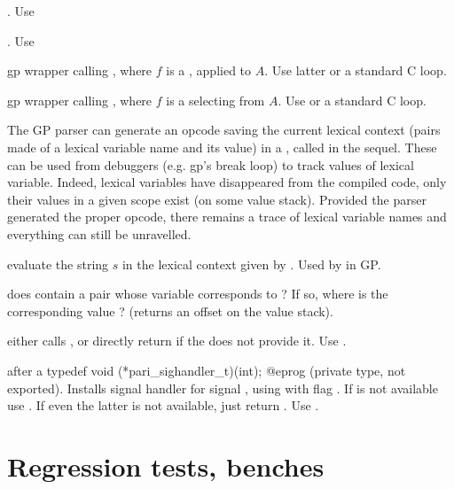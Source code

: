 . Use 

. Use 

 gp wrapper calling , where $f$
is a , applied to $A$. Use  latter or a standard C
loop.

 gp wrapper calling , where $f$
is a  selecting from $A$. Use  or a standard C loop.


The GP parser can generate an opcode saving the current lexical context
(pairs made of a lexical variable name and its value) in a , called
 in the sequel. These can be used from debuggers (e.g. gp's break
loop) to track values of lexical variable. Indeed, lexical variables have
disappeared from the compiled code, only their values in a given scope exist
(on some value stack). Provided the parser generated the proper opcode, there
remains a trace of lexical variable names and everything can still be
unravelled.

 evaluate the string $s$
in the lexical context given by .  Used by  in GP.

 does  contain
a pair whose variable corresponds to  ? If so, where is the
corresponding value ? (returns an offset on the value stack).


 either calls , or directly
return  if the  does not provide it. Use .

 after a
\bprog
  typedef void (*pari_sighandler_t)(int);
@eprog\noindent
(private type, not exported). Installs signal handler  for
signal , using  with flag . If
 is not available use . If even the latter is not
available, just return . Use .

\chapter{Regression tests, benches}


